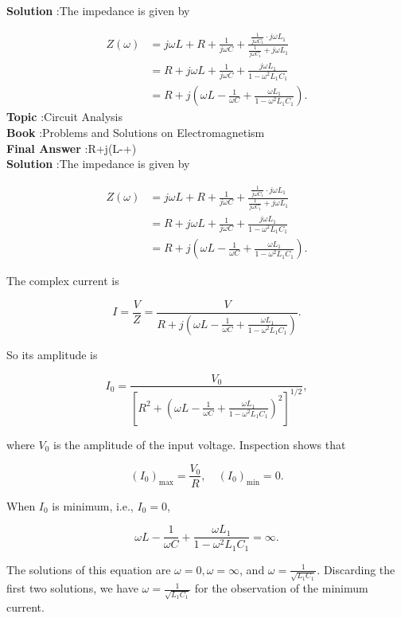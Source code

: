 \documentclass[10pt]{article}
\begin{document}
\textbf{Solution} :The impedance is given by

$$
\begin{aligned}
Z(\omega) &=j \omega L+R+\frac{1}{j \omega C}+\frac{\frac{1}{j \omega C_{1}} \cdot j \omega L_{1}}{\frac{1}{j \omega C_{1}}+j \omega L_{1}} \\
&=R+j \omega L+\frac{1}{j \omega C}+\frac{j \omega L_{1}}{1-\omega^{2} L_{1} C_{1}} \\
&=R+j\left(\omega L-\frac{1}{\omega C}+\frac{\omega L_{1}}{1-\omega^{2} L_{1} C_{1}}\right) .
\end{aligned}
$$
\textbf{Topic} :Circuit Analysis\\
\textbf{Book} :Problems and Solutions on Electromagnetism\\
\textbf{Final Answer} :R+j\left(\omega L-+\right)\\


\textbf{Solution} :The impedance is given by

$$
\begin{aligned}
Z(\omega) &=j \omega L+R+\frac{1}{j \omega C}+\frac{\frac{1}{j \omega C_{1}} \cdot j \omega L_{1}}{\frac{1}{j \omega C_{1}}+j \omega L_{1}} \\
&=R+j \omega L+\frac{1}{j \omega C}+\frac{j \omega L_{1}}{1-\omega^{2} L_{1} C_{1}} \\
&=R+j\left(\omega L-\frac{1}{\omega C}+\frac{\omega L_{1}}{1-\omega^{2} L_{1} C_{1}}\right) .
\end{aligned}
$$

 The complex current is

$$
I=\frac{V}{Z}=\frac{V}{R+j\left(\omega L-\frac{1}{\omega C}+\frac{\omega L_{1}}{1-\omega^{2} L_{1} C_{1}}\right)} .
$$

So its amplitude is

$$
I_{0}=\frac{V_{0}}{\left[R^{2}+\left(\omega L-\frac{1}{\omega C}+\frac{\omega L_{1}}{1-\omega^{2} L_{1} C_{1}}\right)^{2}\right]^{1 / 2}},
$$

where $V_{0}$ is the amplitude of the input voltage. Inspection shows that

$$
\left(I_{0}\right)_{\max }=\frac{V_{0}}{R}, \quad\left(I_{0}\right)_{\min }=0 .
$$

When $I_{0}$ is minimum, i.e., $I_{0}=0$,

$$
\omega L-\frac{1}{\omega C}+\frac{\omega L_{1}}{1-\omega^{2} L_{1} C_{1}}=\infty .
$$

The solutions of this equation are $\omega=0, \omega=\infty$, and $\omega=\frac{1}{\sqrt{L_{1} C_{1}}}$. Discarding the first two solutions, we have $\omega=\frac{1}{\sqrt{L_{1} C_{1}}}$ for the observation of the minimum current.
\end{document}
